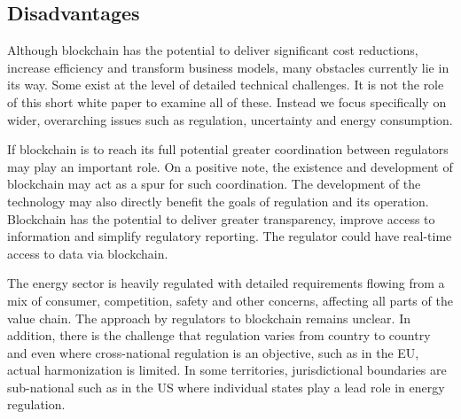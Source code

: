 \documentclass[a4paper]{article}
\begin{document}
	\subsection{Disadvantages}
	Although blockchain has the potential to deliver significant cost reductions, increase efficiency and transform business models, many obstacles currently lie in its way. Some exist at the level of detailed technical challenges. It is not the role of this short white paper to examine all of these. Instead we focus specifically on wider, overarching issues such as regulation, uncertainty and energy consumption.\cite{bcdevrole}
	
	If blockchain is to reach its full potential greater coordination between regulators may play an important role. On a positive note, the existence and development of blockchain may act as a spur for such coordination. The development of the technology may also directly benefit the goals of regulation and its operation. Blockchain has the potential to deliver greater transparency, improve access to information and simplify regulatory reporting. The regulator could have real-time access to data via blockchain.
	
	The energy sector is heavily regulated with detailed requirements flowing from a mix of consumer, competition, safety and other concerns, affecting all parts of the value chain. The approach by regulators to blockchain remains unclear. In addition, there is the challenge that regulation varies from country to country and even where cross-national regulation is an objective, such as in the EU, actual harmonization is limited. In some territories, jurisdictional boundaries are sub-national such as in the US where individual states play a lead role in energy regulation.
	
	\newpage
	
	
\end{document}
